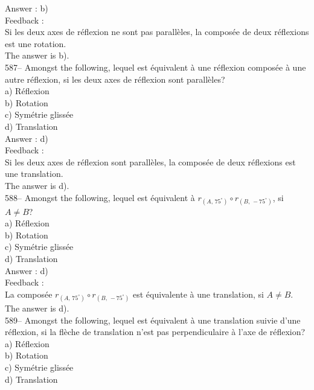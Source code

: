 ﻿\documentclass[letterpaper, 12pt]{article}
\begin{document}
Answer : b) \\

Feedback : \\
Si les deux axes de r\'eflexion ne sont pas parall\`eles, la compos\'ee de
deux r\'eflexions est une rotation.\\
The answer is b).\\

587-- Amongst the following, lequel est \'equivalent \`a une
r\'eflexion compos\'ee \`a une autre r\'eflexion, si les deux axes de
r\'eflexion sont parall\`eles?\\
a) R\'eflexion\\
b) Rotation\\
c) Sym\'etrie gliss\'ee\\
d) Translation\\

Answer : d) \\

Feedback : \\
Si les deux axes de r\'eflexion sont parall\`eles, la compos\'ee de deux
r\'eflexions est une translation.\\
The answer is d).\\

588-- Amongst the following, lequel est \'equivalent \`a
$r_{\left(A,\,75^{\circ}\right)} \circ r_{\left(B,\,-75^{\circ}\right) }$,
si $A\neq B$?\\
a) R\'eflexion\\
b) Rotation\\
c) Sym\'etrie gliss\'ee\\
d) Translation\\

Answer : d)\\

Feedback : \\
La compos\'ee $r_{\left(A,\,75^{\circ}\right)} \circ
r_{\left(B,\,-75^{\circ}\right) }$ est \'equivalente \`a une translation, si
$A\neq B$.  The answer is d).\\

589-- Amongst the following, lequel est \'equivalent \`a une
translation suivie d'une r\'eflexion, si la fl\`eche de translation n'est
pas perpendiculaire \`a l'axe de r\'eflexion?\\
a) R\'eflexion\\
b) Rotation\\
c) Sym\'etrie gliss\'ee\\
d) Translation\\
\end{document}
